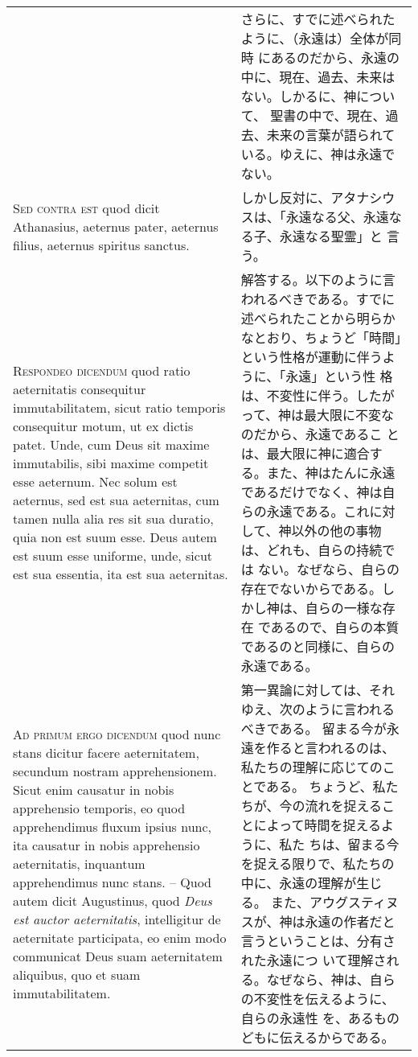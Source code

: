 \documentclass[10pt]{jsarticle} %
\begin{document}
\begin{longtable}{p{21em}p{21em}}
&

さらに、すでに述べられたように、（永遠は）全体が同時
にあるのだから、永遠の中に、現在、過去、未来はない。しかるに、神について、
聖書の中で、現在、過去、未来の言葉が語られている。ゆえに、神は永遠でない。

\\

{\scshape Sed contra est} quod dicit Athanasius, aeternus pater, aeternus
filius, aeternus spiritus sanctus.

&

しかし反対に、アタナシウスは、「永遠なる父、永遠なる子、永遠なる聖霊」と
言う。

\\


{\scshape Respondeo dicendum} quod ratio aeternitatis consequitur
immutabilitatem, sicut ratio temporis consequitur motum, ut ex dictis
patet. Unde, cum Deus sit maxime immutabilis, sibi maxime competit esse
aeternum. Nec solum est aeternus, sed est sua aeternitas, cum tamen
nulla alia res sit sua duratio, quia non est suum esse. Deus autem est
suum esse uniforme, unde, sicut est sua essentia, ita est sua
aeternitas.

&

解答する。以下のように言われるべきである。すでに述べられたことから明らか
なとおり、ちょうど「時間」という性格が運動に伴うように、「永遠」という性
格は、不変性に伴う。したがって、神は最大限に不変なのだから、永遠であるこ
とは、最大限に神に適合する。また、神はたんに永遠であるだけでなく、神は自
らの永遠である。これに対して、神以外の他の事物は、どれも、自らの持続では
ない。なぜなら、自らの存在でないからである。しかし神は、自らの一様な存在
であるので、自らの本質であるのと同様に、自らの永遠である。

\\


{\scshape Ad primum ergo dicendum} quod nunc stans dicitur facere
aeternitatem, secundum nostram apprehensionem. Sicut enim causatur in
nobis apprehensio temporis, eo quod apprehendimus fluxum ipsius nunc,
ita causatur in nobis apprehensio aeternitatis, inquantum apprehendimus
nunc stans. -- Quod autem dicit Augustinus, quod {\itshape Deus est auctor
aeternitatis}, intelligitur de aeternitate participata, eo enim modo
communicat Deus suam aeternitatem aliquibus, quo et suam
immutabilitatem.

&

第一異論に対しては、それゆえ、次のように言われるべきである。
留まる今が永遠を作ると言われるのは、私たちの理解に応じてのことである。
ちょうど、私たちが、今の流れを捉えることによって時間を捉えるように、私た
ちは、留まる今を捉える限りで、私たちの中に、永遠の理解が生じる。
また、アウグスティヌスが、神は永遠の作者だと言うということは、分有された永遠につ
いて理解される。なぜなら、神は、自らの不変性を伝えるように、自らの永遠性
を、あるものどもに伝えるからである。


\end{longtable}
\end{document}
